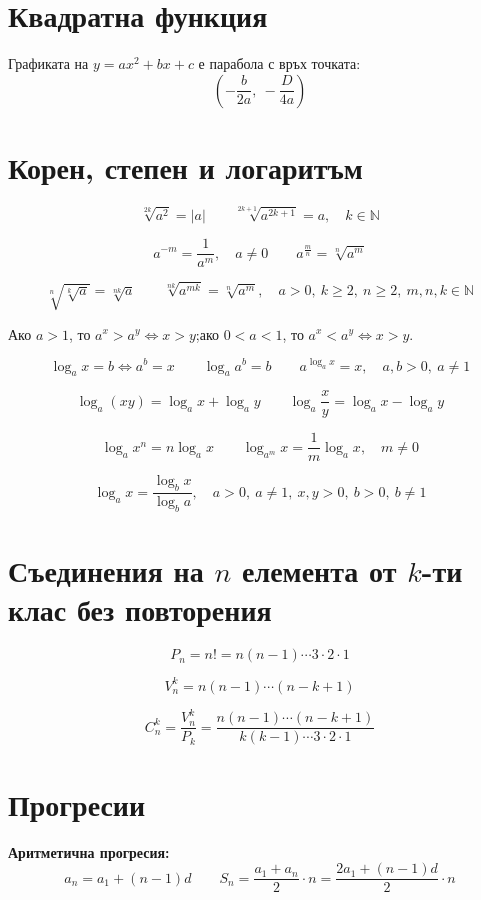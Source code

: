 \documentclass[12pt,a4paper]{article}
\begin{document}
\section{Квадратна функция}

Графиката на $y = ax^2 + bx + c$ е парабола с връх точката:
$$\left(-\frac{b}{2a},\ -\frac{D}{4a}\right)$$

\section{Корен, степен и логаритъм}

$$\sqrt[2k]{a^2} = |a| \qquad \sqrt[2k+1]{a^{2k+1}} = a,\quad k \in \mathbb{N}$$

$$a^{-m} = \frac{1}{a^m},\quad a \neq 0 \qquad a^{\frac{m}{n}} = \sqrt[n]{a^m}$$

$$\sqrt[n]{\sqrt[k]{a}} = \sqrt[nk]{a} \qquad \sqrt[nk]{a^{mk}} = \sqrt[n]{a^m},\quad a > 0,\ k \geq 2,\ n \geq 2,\ m, n, k \in \mathbb{N}$$

Ако $a > 1$, то $a^x > a^y \Leftrightarrow x > y$;\quad ако $0 < a < 1$, то $a^x < a^y \Leftrightarrow x > y$.

$$\log_a x = b \Leftrightarrow a^b = x \qquad \log_a a^b = b \qquad a^{\log_a x} = x,\quad a, b > 0,\ a \neq 1$$

$$\log_a(xy) = \log_a x + \log_a y \qquad \log_a\frac{x}{y} = \log_a x - \log_a y$$

$$\log_a x^n = n\log_a x \qquad \log_{a^m} x = \frac{1}{m}\log_a x,\quad m \neq 0$$

$$\log_a x = \frac{\log_b x}{\log_b a},\quad a > 0,\ a \neq 1,\ x, y > 0,\ b > 0,\ b \neq 1$$

\section{Съединения на $n$ елемента от $k$-ти клас без повторения}

$$P_n = n! = n(n-1)\cdots 3\cdot 2\cdot 1$$

$$V_n^k = n(n-1)\cdots(n-k+1)$$

$$C_n^k = \frac{V_n^k}{P_k} = \frac{n(n-1)\cdots(n-k+1)}{k(k-1)\cdots 3\cdot 2\cdot 1}$$

\section{Прогресии}

\textbf{Аритметична прогресия:}
$$a_n = a_1 + (n-1)d \qquad S_n = \frac{a_1 + a_n}{2}\cdot n = \frac{2a_1 + (n-1)d}{2}\cdot n$$
\end{document}
